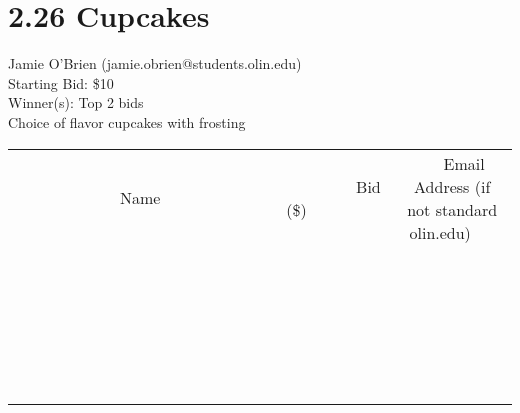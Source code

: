 \documentclass[11pt]{article}
\begin{document}
\section*{2.26 Cupcakes}
Jamie O'Brien (jamie.obrien@students.olin.edu) \\
Starting Bid: \$10 \\
Winner(s): 
Top 2 bids \\
Choice of flavor cupcakes with  frosting \\[6ex]
\begin{tabular}{c c c}
~~~~~~~~~~~~~Name~~~~~~~~~~~~~ & ~~~~~~~~~Bid (\$)~~~~~~~~~ & ~~~Email Address (if not standard olin.edu)~~~ \\
 & & \\
\hline
 & & \\
\hline
 & & \\
\hline
 & & \\
\hline
 & & \\
\hline
 & & \\
\hline
 & & \\
\hline
 & & \\
\hline
 & & \\
\hline
 & & \\
\hline
 & & \\
\hline
 & & \\
\hline
 & & \\
\hline
 & & \\
\hline
 & & \\
\hline
 & & \\
\hline
 & & \\
\hline
 & & \\
\hline
 & & \\
\hline
 & & \\
\hline
 & & \\
\hline
 & & \\
\hline
 & & \\
\hline
 & & \\
\hline
 & & \\
\hline
 & & \\
\hline
\end{tabular}
\clearpage
\end{document}
